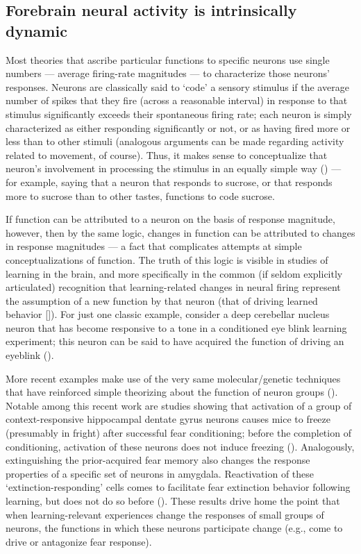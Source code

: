 \begin{refsection}
\section{Forebrain neural activity is intrinsically dynamic}
Most theories that ascribe particular functions to specific neurons use single numbers — average firing-rate magnitudes — to characterize those neurons’ responses. Neurons are classically said to ‘code’ a sensory stimulus if the average number of spikes that they fire (across a reasonable interval) in response to that stimulus significantly exceeds their spontaneous firing rate; each neuron is simply characterized as either responding significantly or not, or as having fired more or less than to other stimuli (analogous arguments can be made regarding activity related to movement, of course). Thus, it makes sense to conceptualize that neuron’s involvement in processing the stimulus in an equally simple way (\cite{chen2011a,hubel1995a,lavi2018a,mazurek2014a,steinmetz2019a,wang2018a}) — for example, saying that a neuron that responds to sucrose, or that responds more to sucrose than to other tastes, functions to code sucrose.

If function can be attributed to a neuron on the basis of response magnitude, however, then by the same logic, changes in function can be attributed to changes in response magnitudes — a fact that complicates attempts at simple conceptualizations of function. The truth of this logic is visible in studies of learning in the brain, and more specifically in the common (if seldom explicitly articulated) recognition that learning-related changes in neural firing represent the assumption of a new function by that neuron (that of driving learned behavior [\cite{banerjee2020a,barsy2020a,ross2018a}]). For just one classic example, consider a deep cerebellar nucleus neuron that has become responsive to a tone in a conditioned eye blink learning experiment; this neuron can be said to have acquired the function of driving an eyeblink (\cite{mm2017a}).

More recent examples make use of the very same molecular/genetic techniques that have reinforced simple theorizing about the function of neuron groups (\cite{aqrabawi2020a,butler2020a,josselyn2018a,josselyn2020a,sun2020a}). Notable among this recent work are studies showing that activation of a group of context-responsive hippocampal dentate gyrus neurons causes mice to freeze (presumably in fright) after successful fear conditioning; before the completion of conditioning, activation of these neurons does not induce freezing (\cite{ramirez2013a}). Analogously, extinguishing the prior-acquired fear memory also changes the response properties of a specific set of neurons in amygdala. Reactivation of these ‘extinction-responding’ cells comes to facilitate fear extinction behavior following learning, but does not do so before (\cite{zhang2020a}). These results drive home the point that when learning-relevant experiences change the responses of small groups of neurons, the functions in which these neurons participate change (e.g., come to drive or antagonize fear response).


\end{refsection}
